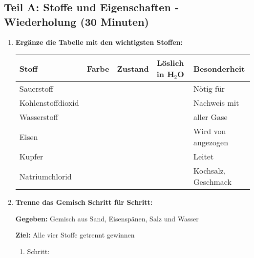 \subsection*{Teil A: Stoffe und Eigenschaften - Wiederholung (30 Minuten)}

\begin{enumerate}[label=\arabic*.]
    \item \textbf{Ergänze die Tabelle mit den wichtigsten Stoffen:}
    \vspace{0.5cm}

    \begin{tabular}{|p{3cm}|p{2cm}|p{2cm}|p{3cm}|p{3cm}|}
        \hline
        \textbf{Stoff} & \textbf{Farbe} & \textbf{Zustand} & \textbf{Löslich in H$_2$O} & \textbf{Besonderheit} \\
        \hline
        Sauerstoff & & & & Nötig für \underline{\hspace{2cm}} \\
        \hline
        Kohlenstoffdioxid & & & & Nachweis mit \underline{\hspace{2cm}} \\
        \hline
        Wasserstoff & & & & \underline{\hspace{2cm}} aller Gase \\
        \hline
        Eisen & & & & Wird von \underline{\hspace{2cm}} angezogen \\
        \hline
        Kupfer & & & & Leitet \underline{\hspace{2cm}} \\
        \hline
        Natriumchlorid & & & & Kochsalz, \underline{\hspace{2cm}} Geschmack \\
        \hline
    \end{tabular}

    \vspace{1cm}

    \item \textbf{Trenne das Gemisch Schritt für Schritt:}
    \vspace{0.5cm}

    \textbf{Gegeben:} Gemisch aus Sand, Eisenspänen, Salz und Wasser

    \textbf{Ziel:} Alle vier Stoffe getrennt gewinnen

    \begin{enumerate}[label=\arabic*.)]
        \item Schritt: \underline{\hspace{8cm}}
        \vspace{0.5cm}


\end{enumerate}
\end{enumerate}
